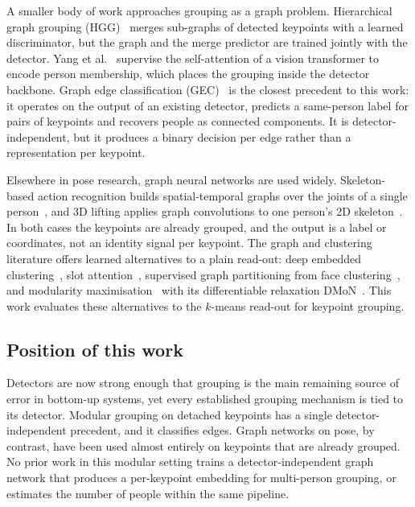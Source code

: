 A smaller body of work approaches grouping as a graph problem.
Hierarchical graph grouping (HGG)~\citep{jin2020hgg} merges sub-graphs of detected keypoints with a learned discriminator,
but the graph and the merge predictor are trained jointly with the detector.
Yang et al.~\citep{yang2023instanceaware} supervise the self-attention of a vision transformer to encode person membership,
which places the grouping inside the detector backbone.
Graph edge classification (GEC)~\citep{maher2025gec} is the closest precedent to this work:
it operates on the output of an existing detector, predicts a same-person label for pairs of keypoints
and recovers people as connected components.
It is detector-independent, but it produces a binary decision per edge rather than a representation per keypoint.

Elsewhere in pose research, graph neural networks are used widely.
Skeleton-based action recognition builds spatial-temporal graphs over the joints of a single person~\citep{yan2018stgcn,shi2019twostreamadaptive},
and 3D lifting applies graph convolutions to one person's 2D skeleton~\citep{zhao2019semanticgcn,ci2019optimizing,liu2020gastnet}.
In both cases the keypoints are already grouped,
and the output is a label or coordinates, not an identity signal per keypoint.
The graph and clustering literature offers learned alternatives to a plain read-out:
deep embedded clustering~\citep{xie2016dec}, slot attention~\citep{locatello2020slotattention},
supervised graph partitioning from face clustering~\citep{yang2019face,yang2020gcnve},
and modularity maximisation~\citep{newman2006modularity} with its differentiable relaxation DMoN~\citep{tsitsulin2023dmon}.
This work evaluates these alternatives to the $k$-means read-out for keypoint grouping.

\subsection{Position of this work}
\label{sec:related_gap}

Detectors are now strong enough that grouping is the main remaining source of error in bottom-up systems,
yet every established grouping mechanism is tied to its detector.
Modular grouping on detached keypoints has a single detector-independent precedent,
and it classifies edges.
Graph networks on pose, by contrast, have been used almost entirely on keypoints that are already grouped.
No prior work in this modular setting trains a detector-independent graph network
that produces a per-keypoint embedding for multi-person grouping,
or estimates the number of people within the same pipeline.